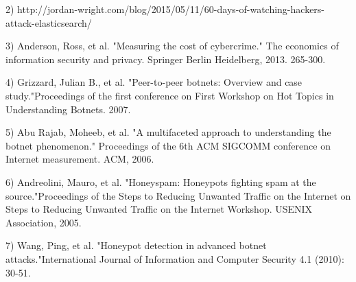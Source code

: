 2) http://jordan-wright.com/blog/2015/05/11/60-days-of-watching-hackers-attack-elasticsearch/

3) Anderson, Ross, et al. "Measuring the cost of cybercrime." The economics of information security and privacy. Springer Berlin Heidelberg, 2013. 265-300.

4) Grizzard, Julian B., et al. "Peer-to-peer botnets: Overview and case study."Proceedings of the first conference on First Workshop on Hot Topics in Understanding Botnets. 2007.

5) Abu Rajab, Moheeb, et al. "A multifaceted approach to understanding the botnet phenomenon." Proceedings of the 6th ACM SIGCOMM conference on Internet measurement. ACM, 2006.

6) Andreolini, Mauro, et al. "Honeyspam: Honeypots fighting spam at the source."Proceedings of the Steps to Reducing Unwanted Traffic on the Internet on Steps to Reducing Unwanted Traffic on the Internet Workshop. USENIX Association, 2005.

7) Wang, Ping, et al. "Honeypot detection in advanced botnet attacks."International Journal of Information and Computer Security 4.1 (2010): 30-51.



